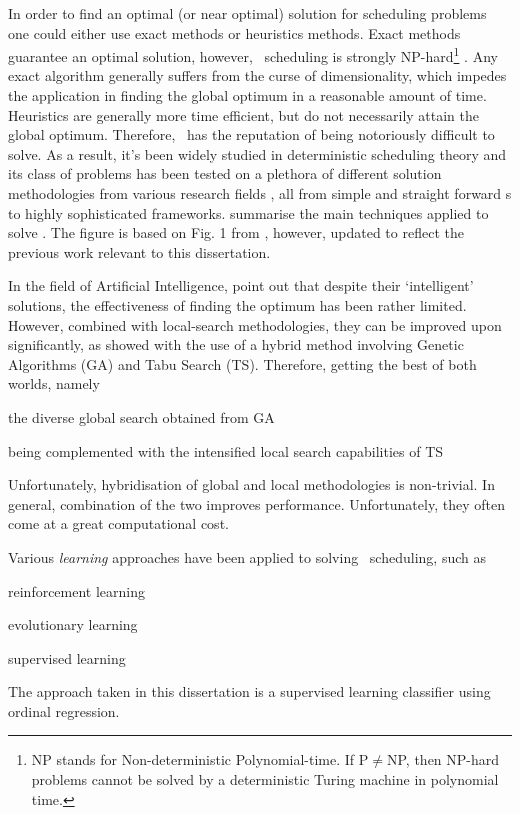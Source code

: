 In order to find an optimal (or near optimal) solution for scheduling problems 
one could either use exact methods or heuristics methods. Exact methods 
guarantee an optimal solution, however, \jsp\ scheduling is strongly 
NP-hard\footnote{NP stands for Non-deterministic Polynomial-time.
    If P$\neq$NP, then NP-hard problems cannot be solved by a deterministic 
    Turing machine in polynomial time.}
\citep{Garey76:NPhard}. Any exact algorithm generally suffers from the curse of 
dimensionality, which impedes the application in finding the global optimum in 
a reasonable amount of time. Heuristics are generally more time efficient, but 
do not necessarily attain the global optimum. Therefore, \JSP\ has the 
reputation of being notoriously difficult to solve. As a result, it's 
been widely studied in deterministic scheduling theory and its class of 
problems has been tested on a plethora of different solution methodologies from 
various research fields \citep{Meeran12}, all from simple and straight forward 
\dr s to highly sophisticated frameworks.
 summarise the main techniques applied to solve \JSP. The 
figure is based on Fig. 1 from \citet{Jain99}, however, updated to reflect the 
previous work relevant to this dissertation.


In the field of Artificial Intelligence, \cite{Meeran12} point out that despite 
their `intelligent' solutions, the effectiveness of finding the optimum has 
been rather limited. However, combined with local-search methodologies, they 
can be improved upon significantly, as \citeauthor{Meeran12} showed with the 
use of a hybrid method involving Genetic Algorithms (GA) and Tabu Search (TS). 
Therefore, getting the best of both worlds, namely
\begin{enumerate*}[label={{}}]
  \item the diverse global search obtained from GA 
  \item being complemented with the intensified local search capabilities of TS
\end{enumerate*}
Unfortunately, hybridisation of global and local methodologies is non-trivial. 
In general, combination of the two improves performance. Unfortunately, they 
often come at a great computational cost.  

Various \emph{learning} approaches have been applied to solving \jsp\ 
scheduling, such as
\begin{enumerate*}
  \item reinforcement learning \citep{Zhang95}
  \item evolutionary learning \citep{Tay08}
  \item supervised learning \citep{Siggi05,Malik08}
\end{enumerate*}
The approach taken in this 
dissertation is a supervised learning classifier using ordinal regression. 

